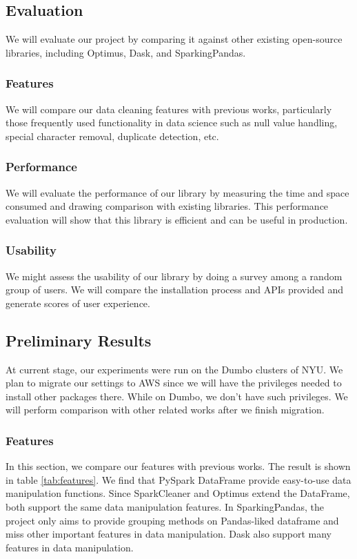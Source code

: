 \documentclass[sigconf]{acmart}
\begin{document}
\subsection{Evaluation}
We will evaluate our project by comparing it against other existing open-source libraries, including Optimus\cite{optimus}, Dask\cite{dask}, and SparkingPandas\cite{sparklingpandas}. 
\subsubsection{Features}
We will compare our data cleaning features with previous works, particularly those frequently used functionality in data science such as null value handling, special character removal, duplicate detection, etc. 
\subsubsection{Performance}
We will evaluate the performance of our library by measuring the time and space consumed and drawing comparison with existing libraries. This performance evaluation will show that this library is efficient and can be useful in production. 
\subsubsection{Usability}
We might assess the usability of our library by doing a survey among a random group of users. We will compare the installation process and APIs provided and generate scores of user experience.

\subsection{Preliminary Results}
At current stage, our experiments were run on the Dumbo clusters of NYU. We plan to migrate our settings to AWS since we will have the privileges needed to install other packages there. While on Dumbo, we don't have such privileges. We will perform comparison with other related works after we finish migration.

\subsubsection{Features}
In this section, we compare our features with previous works. The result is shown in table \ref{tab:features}. We find that PySpark DataFrame provide easy-to-use data manipulation functions. Since SparkCleaner and Optimus extend the DataFrame, both support the same data manipulation features. In SparkingPandas, the project only aims to provide grouping methods on Pandas-liked dataframe and miss other important features in data manipulation. Dask also support many features in data manipulation. 
\end{document}
